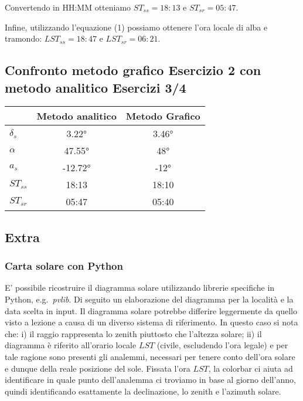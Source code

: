 \documentclass[11pt]{article}
\begin{document}
    
 
            
    
    Convertendo in HH:MM otteniamo \(ST_{ss}=18{:}13\) e
\(ST_{sr}=05{:}47\).

    
 
            
    
    Infine, utilizzando l'equazione (1) possiamo ottenere l'ora locale di
alba e tramondo: \(LST_{ss}=18{:}47\) e \(LST_{sr}=06{:}21\).

    

    \hypertarget{confronto-metodo-grafico-esercizio-2-con-metodo-analitico-esercizi-34}{%
\subsection{Confronto metodo grafico Esercizio 2 con metodo analitico
Esercizi
3/4}\label{confronto-metodo-grafico-esercizio-2-con-metodo-analitico-esercizi-34}}

\begin{longtable}[]{@{}lcc@{}}
\toprule
& Metodo analitico & Metodo Grafico \\
\midrule
\endhead
\(\delta_s\) & 3.22° & 3.46° \\
\(\alpha\) & 47.55° & 48° \\
\(a_s\) & -12.72° & -12° \\
\(ST_{ss}\) & 18:13 & 18:10 \\
\(ST_{sr}\) & 05:47 & 05:40 \\
\bottomrule
\end{longtable}

    \hypertarget{extra}{%
\subsection{Extra}\label{extra}}

\hypertarget{carta-solare-con-python}{%
\subsubsection{Carta solare con Python}\label{carta-solare-con-python}}

    E' possibile ricostruire il diagramma solare utilizzando librerie
specifiche in Python, e.g.~\emph{pvlib}. Di seguito un elaborazione del
diagramma per la località e la data scelta in input. Il diagramma solare
potrebbe differire leggermente da quello visto a lezione a causa di un
diverso sistema di riferimento. In questo caso si nota che: i) il raggio
rappresenta lo zenith piuttosto che l'altezza solare; ii) il diagramma è
riferito all'orario locale \(LST\) (civile, escludendo l'ora legale) e
per tale ragione sono presenti gli analemmi, necessari per tenere conto
dell'ora solare e dunque della reale posizione del sole. Fissata l'ora
\(LST\), la colorbar ci aiuta ad identificare in quale punto
dell'analemma ci troviamo in base al giorno dell'anno, quindi
identificando esattamente la declinazione, lo zenith e l'azimuth solare.
\end{document}
